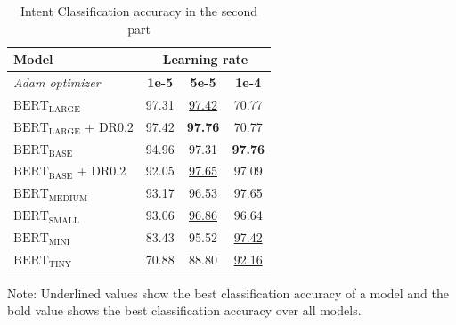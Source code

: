 \documentclass[a4paper]{article}
\begin{document}
\begin{table}[ht!]
  \caption{Intent Classification accuracy in the second part}
  \label{tab:intent_accuracy_part2}
  \centering
  \begin{tabular}{l|c c c}
    \toprule
    \textbf{Model} & \multicolumn{3}{c}{\textbf{Learning rate} } \\
    \midrule
    \textit{Adam optimizer} & \textbf{1e-5} & \textbf{5e-5} & \textbf{1e-4} \\
    \midrule
    $\text{BERT}_{\text{LARGE}}$ & 97.31 & \underline{97.42} & 70.77 \\
    $\text{BERT}_{\text{LARGE}}$ + DR0.2 & 97.42 & \textbf{97.76} & 70.77 \\
    $\text{BERT}_{\text{BASE}}$ & 94.96 & 97.31 & \textbf{97.76} \\
    $\text{BERT}_{\text{BASE}}$ + DR0.2 & 92.05 & \underline{97.65} & 97.09\\
    $\text{BERT}_{\text{MEDIUM}}$ & 93.17 & 96.53 & \underline{97.65} \\
    $\text{BERT}_{\text{SMALL}}$ & 93.06 & \underline{96.86} & 96.64 \\
    $\text{BERT}_{\text{MINI}}$ & 83.43 & 95.52 & \underline{97.42} \\
    $\text{BERT}_{\text{TINY}}$ & 70.88 & 88.80 & \underline{92.16} \\
    \bottomrule
  \end{tabular}
  \begin{minipage}{7.5cm}
    \vspace{0.1cm}
    Note: Underlined values show the best classification accuracy of a model and the bold value shows the best classification accuracy over all models. 
  \end{minipage}
\end{table}


\end{document}
